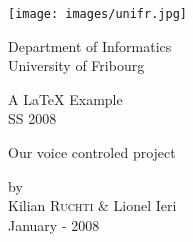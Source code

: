 
\begin{titlepage} 
	\begin{center}
		
		\texttt{[image: images/unifr.jpg]}\\
		
		\vspace{0.5cm}
		
		Department of Informatics\\
		University of Fribourg\\

		\vspace{3cm}
		
		\begin{large}
		A \LaTeX{} Example\\
		SS 2008\\
		\end{large}
		
		\vspace{3cm}
		
		\begin{huge}
			{\sf Our voice controled project}
		\end{huge}
		
				
		\vspace{3cm}
		
		\begin{large}
			\vspace{1cm}
			 by\\
			 Kilian \textsc{Ruchti} & Lionel Ieri\\
			\vspace{0.2cm}
			January - 2008
		\end{large}
				
	\end{center}
\end{titlepage}
